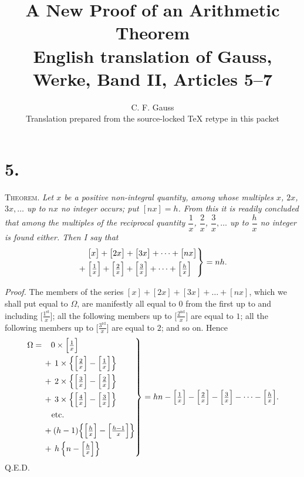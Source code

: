 \documentclass[11pt]{article}
\title{A New Proof of an Arithmetic Theorem\\[2pt]
\large English translation of Gauss, Werke, Band II, Articles 5--7}
\author{C. F. Gauss\\[2pt]\normalsize Translation prepared from the source-locked TeX retype in this packet}
\date{}
\begin{document}
\maketitle

\section*{5.}

\textsc{Theorem.} \emph{Let $x$ be a positive non-integral quantity, among whose
multiples $x$, $2x$, $3x,\dots$ up to $nx$ no integer occurs; put $[nx]=h$.
From this it is readily concluded that among the multiples of the reciprocal
quantity
$\dfrac{1}{x}$, $\dfrac{2}{x}$, $\dfrac{3}{x},\dots$ up to $\dfrac{h}{x}$
no integer is found either. Then I say that}
\[
  \left.
  \begin{aligned}
  &\bigl[x\bigr]+\bigl[2x\bigr]+\bigl[3x\bigr]+\dots+\bigl[nx\bigr]\\
  +\;&\Bigl[\tfrac{1}{x}\Bigr]+\Bigl[\tfrac{2}{x}\Bigr]+\Bigl[\tfrac{3}{x}\Bigr]
       +\dots+\Bigl[\tfrac{h}{x}\Bigr]
  \end{aligned}
  \right\}=nh.
\]

\medskip
\emph{Proof.} The members of the series
$[x]+[2x]+[3x]+\dots+[nx]$, which we shall put equal to $\Omega$, are
manifestly all equal to $0$ from the first up to and including
$\bigl[\tfrac{1^{\mathrm{st}}}{x}\bigr]$; all the following members up to
$\bigl[\tfrac{2^{\mathrm{nd}}}{x}\bigr]$ are equal to $1$; all the following
members up to $\bigl[\tfrac{3^{\mathrm{rd}}}{x}\bigr]$ are equal to $2$; and
so on. Hence
\[
  \left.
  \begin{aligned}
  \Omega=\, &\phantom{+\,}0\times\Bigl[\tfrac{1}{x}\Bigr]\\
  &+\,1\times\Bigl\{\Bigl[\tfrac{2}{x}\Bigr]-\Bigl[\tfrac{1}{x}\Bigr]\Bigr\}\\
  &+\,2\times\Bigl\{\Bigl[\tfrac{3}{x}\Bigr]-\Bigl[\tfrac{2}{x}\Bigr]\Bigr\}\\
  &+\,3\times\Bigl\{\Bigl[\tfrac{4}{x}\Bigr]-\Bigl[\tfrac{3}{x}\Bigr]\Bigr\}\\
  &\quad\text{etc.}\\
  &+(h-1)\Bigl\{\Bigl[\tfrac{h}{x}\Bigr]-\Bigl[\tfrac{h-1}{x}\Bigr]\Bigr\}\\
  &+\,h\,\Bigl\{n-\Bigl[\tfrac{h}{x}\Bigr]\Bigr\}
  \end{aligned}
  \right\}
  = hn-\Bigl[\tfrac{1}{x}\Bigr]-\Bigl[\tfrac{2}{x}\Bigr]-\Bigl[\tfrac{3}{x}\Bigr]
        -\dots-\Bigl[\tfrac{h}{x}\Bigr].
\]
\textsc{Q.E.D.}
\end{document}
